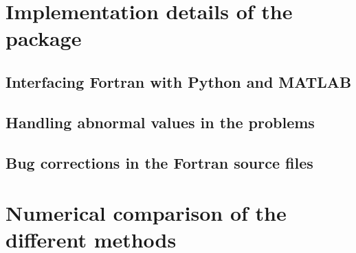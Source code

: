 \section{Implementation details of the  package}

\subsection{Interfacing Fortran with Python and MATLAB}

\subsection{Handling abnormal values in the problems}

\subsection{Bug corrections in the Fortran source files}

\section{Numerical comparison of the different methods}
